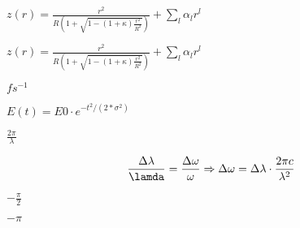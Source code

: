 \documentclass{article}
\begin{document}
$ z(r)=\frac{r^2}{R\left( 1+\sqrt{1-(1+\kappa)\frac{r^2}{R^2}}\right)}+\sum_l\alpha_lr^l$
\pagebreak

$ z(r)=\frac{r^2}{R\left( 1+\sqrt{1-(1+\kappa)\frac{r^2}{R^2}}\right)}+\sum_l \alpha_l r^l $
\pagebreak

$fs^{-1}$
\pagebreak

$E(t)=E0 \cdot e^{-t^2/(2*\sigma^2)}$
\pagebreak

$ \frac{2\pi}{\lambda}$
\pagebreak

\[\frac{\Delta\lambda}{\lamda}=\frac{\Delta\omega}{\omega}\Rightarrow \Delta\omega=\Delta\lambda \cdot \frac{2\pi c}{\lambda^2}\]
\pagebreak

$-\frac{\pi}{2}$
\pagebreak

$-\pi$
\pagebreak
\end{document}
